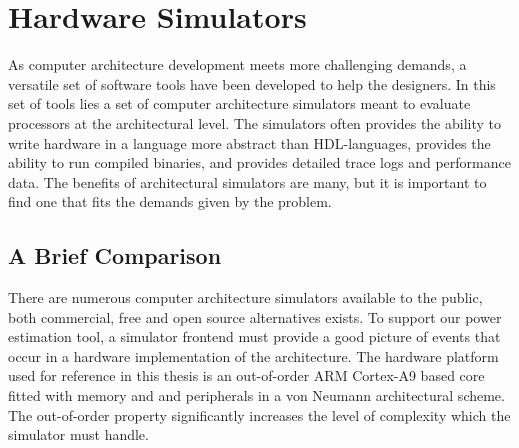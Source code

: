 \section{Hardware Simulators}

As computer architecture development meets more challenging demands, a versatile
set of software tools have been developed to help the designers. In this set of
tools lies a set of computer architecture simulators meant to evaluate
processors at the architectural level. The simulators often provides the ability
to write hardware in a language more abstract than HDL-languages, provides the
ability to run compiled binaries, and provides detailed trace logs and
performance data. The benefits of architectural simulators are many, but it is
important to find one that fits the demands given by the problem.

\subsection{A Brief Comparison}
\label{subsec:simulators}
There are numerous computer architecture simulators available to the public,
both commercial, free and open source alternatives exists. To support our power
estimation tool, a simulator frontend must provide a good picture of events
that occur in a hardware implementation of the architecture. The hardware
platform used for reference in this thesis is an out-of-order ARM Cortex-A9
based core fitted with memory and and peripherals in a von Neumann architectural
scheme. The out-of-order property significantly increases the level of
complexity which the simulator must handle.

